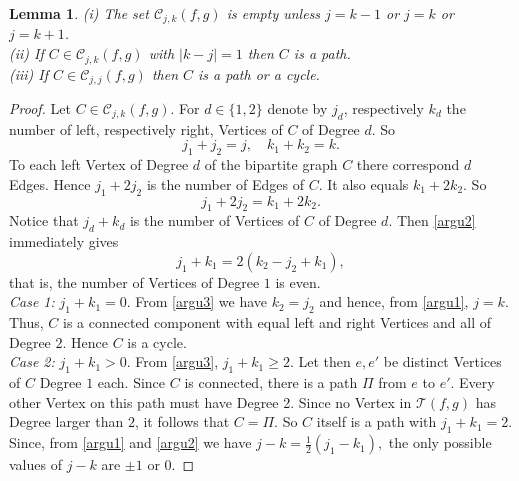 \documentclass[reqno]{amsart}
\theoremstyle{theorem}
\newtheorem{lemma}[theorem]{Lemma}
\theoremstyle{definition}
\theoremstyle{remark}
\def\TT{\mathscr{T}}
\def\CC{\mathscr{C}}
\newcommand{\1}{{\text{\Large $\mathfrak 1$}}}	%
\numberwithin{equation}{section}
\begin{document}
\begin{lemma}
\label{ccut}
(i) The set $\CC_{j,k}(f,g)$ is empty unless $j=k-1$ or $j=k$ or $j=k+1$.
\\
(ii) If $C \in \CC_{j,k}(f,g)$ with $|k-j|=1$ then $C$ is a path.
\\
(iii) If $C \in \CC_{j,j}(f,g)$ then $C$ is a path or a cycle.
\end{lemma}
\begin{proof}
%
Let $C \in \CC_{j, k}(f, g)$. For $d \in \{1,2\}$ denote by $j_d$, respectively
$k_d$ the number of left, respectively right, Vertices of $C$ of Degree $d$. So
\begin{equation}
\label{argu1}
j_1 + j_2 = j, \quad k_1 + k_2 = k.
\end{equation}
To each left Vertex of Degree $d$ of the bipartite graph $C$ there correspond $d$
Edges. Hence $j_1+2j_2$ is the number of Edges of $C$. It also equals $k_1+2k_2$. So
\begin{equation}
\label{argu2}
j_1 + 2 j_2 = k_1 + 2 k_2.
\end{equation}
Notice that $j_d+k_d$ is the number of Vertices of $C$ of Degree $d$.
Then \eqref{argu2} immediately gives 
\begin{equation}
\label{argu3}
j_1 + k_1 = 2 (k_2 - j_2 + k_1),
\end{equation}
that is, the number of Vertices of Degree $1$ is even.
\\
{\em Case 1:} $j_1+k_1=0$. From \eqref{argu3} we have $k_2=j_2$ and hence,
from \eqref{argu1}, $j=k$.
Thus, $C$ is a connected component with equal left and right Vertices and all
of Degree $2$. Hence $C$ is a cycle.
\\
{\em Case 2:} $j_1+k_1 > 0$. From \eqref{argu3}, $j_1+k_1 \ge 2$.
Let then $e, e'$ be distinct Vertices of $C$ Degree $1$ each.
Since $C$ is connected, there is a path $\Pi$ from $e$ to $e'$.
Every other Vertex on this path must have Degree 2. 
Since no Vertex in $\TT(f,g)$ has Degree larger than $2$, it follows that
$C=\Pi$. So $C$ itself is a path with $j_1+k_1=2$.
Since, from \eqref{argu1} and \eqref{argu2} we have
$j-k = \frac12(j_1-k_1),$
the only possible values of $j-k$ are $\pm1$ or $0$.
\end{proof}
\end{document}
